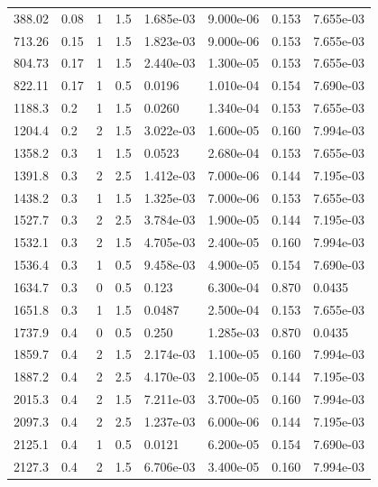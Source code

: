 \documentclass[preview]{standalone}
\begin{document}
{{\begin{tabular}{L{1.2cm}C{1.2cm} C{0.3cm}C{0.5cm} C{1.4cm}C{1.4cm} C{1.4cm}C{1.4cm}}
  388.02  &  0.08  & 1     & 1.5 &  1.685e-03  & 9.000e-06  & 0.153 &  7.655e-03   \\ 
  713.26  &  0.15  & 1     & 1.5 &  1.823e-03  & 9.000e-06  & 0.153 &  7.655e-03   \\ 
  804.73  &  0.17  & 1     & 1.5 &  2.440e-03  & 1.300e-05  & 0.153 &  7.655e-03   \\ 
  822.11  &  0.17  & 1     & 0.5 &  0.0196  & 1.010e-04  & 0.154 &  7.690e-03   \\ 
  1188.3  &   0.2  & 1     & 1.5 &  0.0260  & 1.340e-04  & 0.153 &  7.655e-03   \\ 
  1204.4  &   0.2  & 2     & 1.5 &  3.022e-03  & 1.600e-05  & 0.160 &  7.994e-03   \\ 
  1358.2  &   0.3  & 1     & 1.5 &  0.0523  & 2.680e-04  & 0.153 &  7.655e-03   \\ 
  1391.8  &   0.3  & 2     & 2.5 &  1.412e-03  & 7.000e-06  & 0.144 &  7.195e-03   \\ 
  1438.2  &   0.3  & 1     & 1.5 &  1.325e-03  & 7.000e-06  & 0.153 &  7.655e-03   \\ 
  1527.7  &   0.3  & 2     & 2.5 &  3.784e-03  & 1.900e-05  & 0.144 &  7.195e-03   \\ 
  1532.1  &   0.3  & 2     & 1.5 &  4.705e-03  & 2.400e-05  & 0.160 &  7.994e-03   \\ 
  1536.4  &   0.3  & 1     & 0.5 &  9.458e-03  & 4.900e-05  & 0.154 &  7.690e-03   \\ 
  1634.7  &   0.3  & 0     & 0.5 &  0.123  & 6.300e-04  & 0.870 &  0.0435   \\ 
  1651.8  &   0.3  & 1     & 1.5 &  0.0487  & 2.500e-04  & 0.153 &  7.655e-03   \\ 
  1737.9  &   0.4  & 0     & 0.5 &  0.250  & 1.285e-03  & 0.870 &  0.0435   \\ 
  1859.7  &   0.4  & 2     & 1.5 &  2.174e-03  & 1.100e-05  & 0.160 &  7.994e-03   \\ 
  1887.2  &   0.4  & 2     & 2.5 &  4.170e-03  & 2.100e-05  & 0.144 &  7.195e-03   \\ 
  2015.3  &   0.4  & 2     & 1.5 &  7.211e-03  & 3.700e-05  & 0.160 &  7.994e-03   \\ 
  2097.3  &   0.4  & 2     & 2.5 &  1.237e-03  & 6.000e-06  & 0.144 &  7.195e-03   \\ 
  2125.1  &   0.4  & 1     & 0.5 &  0.0121  & 6.200e-05  & 0.154 &  7.690e-03   \\ 
  2127.3  &   0.4  & 2     & 1.5 &  6.706e-03  & 3.400e-05  & 0.160 &  7.994e-03   \\ 

\end{tabular}}}
\end{document}
